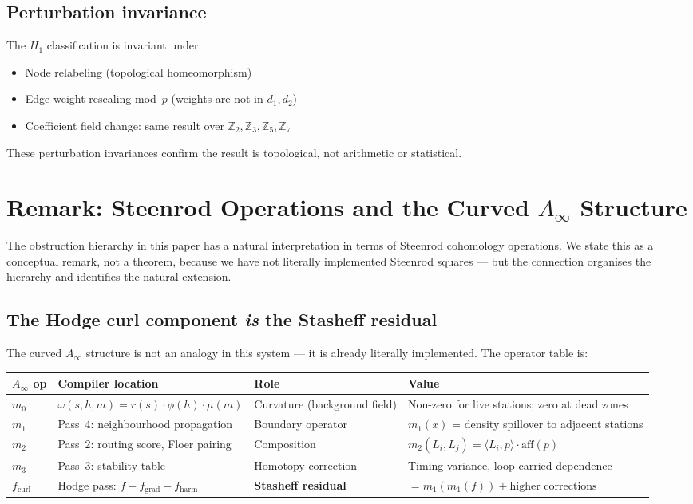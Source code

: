 \documentclass[11pt,a4paper]{article}
\begin{document}
\subsection{Perturbation invariance}

The $H_1$ classification is invariant under:
\begin{itemize}
  \item Node relabeling (topological homeomorphism)
  \item Edge weight rescaling mod~$p$ (weights are not in $d_1, d_2$)
  \item Coefficient field change: same result over $\mathbb{Z}_2, \mathbb{Z}_3,
        \mathbb{Z}_5, \mathbb{Z}_7$
\end{itemize}
These perturbation invariances confirm the result is topological,
not arithmetic or statistical.

\section{Remark: Steenrod Operations and the Curved $A_\infty$ Structure}
\label{sec:steenrod}

The obstruction hierarchy in this paper has a natural interpretation
in terms of Steenrod cohomology operations.
We state this as a conceptual remark, not a theorem, because we have
not literally implemented Steenrod squares --- but the connection
organises the hierarchy and identifies the natural extension.

\subsection*{The Hodge curl component \emph{is} the Stasheff residual}

The curved $A_\infty$ structure is not an analogy in this system ---
it is already literally implemented.
The operator table is:

\begin{center}
\renewcommand{\arraystretch}{1.3}\small
\begin{tabularx}{\linewidth}{p{1.6cm}p{3.5cm}p{3cm}X}
\toprule
\textbf{$A_\infty$ op} & \textbf{Compiler location} &
  \textbf{Role} & \textbf{Value} \\
\midrule
$m_0$ & $\omega(s,h,m) = r(s)\cdot\phi(h)\cdot\mu(m)$ &
  Curvature (background field) &
  Non-zero for live stations; zero at dead zones \\
$m_1$ & Pass~4: neighbourhood propagation &
  Boundary operator &
  $m_1(x)$ = density spillover to adjacent stations \\
$m_2$ & Pass~2: routing score, Floer pairing &
  Composition &
  $m_2(L_i,L_j) = \langle L_i, p\rangle \cdot \mathrm{aff}(p)$ \\
$m_3$ & Pass~3: stability table &
  Homotopy correction &
  Timing variance, loop-carried dependence \\
$f_\text{curl}$ & Hodge pass: $f - f_\text{grad} - f_\text{harm}$ &
  \textbf{Stasheff residual} &
  $= m_1(m_1(f)) + \text{higher corrections}$ \\
\bottomrule
\end{tabularx}
\end{center}
\end{document}
